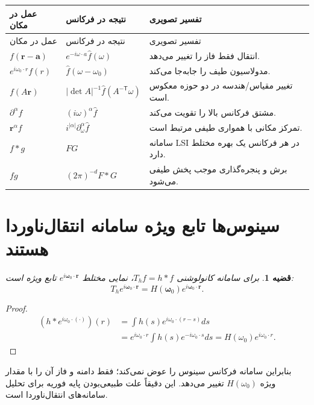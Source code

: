 \documentclass[12pt,openany,oneside]{book}
\newtheorem{theorem}{قضیه}[chapter]
\newcommand{\vect}[1]{\bm{#1}}
\begin{document}
\begin{longtable}{p{}p{}p{}}
\toprule
عمل در مکان & نتیجه در فرکانس & تفسیر تصویری\\
\midrule
\endfirsthead
\toprule
عمل در مکان & نتیجه در فرکانس & تفسیر تصویری\\
\midrule
\endhead
\(f(\vect r-\vect a)\) & \(e^{-i\omega\cdot a}\widehat f(\omega)\) & انتقال فقط فاز را تغییر می‌دهد.\\
\(e^{i\omega_0\cdot r}f(r)\) & \(\widehat f(\omega-\omega_0)\) & مدولاسیون طیف را جابه‌جا می‌کند.\\
\(f(A\vect r)\) & \(|\det A|^{-1}\widehat f(A^{-\mathsf T}\omega)\) & تغییر مقیاس/هندسه در دو حوزه معکوس است.\\
\(\partial^\alpha f\) & \((i\omega)^\alpha\widehat f\) & مشتق فرکانس بالا را تقویت می‌کند.\\
\(\vect r^\alpha f\) & \(i^{|\alpha|}\partial_\omega^\alpha\widehat f\) & تمرکز مکانی با همواری طیفی مرتبط است.\\
\(f*g\) & \(FG\) & سامانه LSI در هر فرکانس یک بهره مختلط دارد.\\
\(fg\) & \((2\pi)^{-d}F*G\) & برش و پنجره‌گذاری موجب پخش طیفی می‌شود.\\
\bottomrule
\end{longtable}

\section{سینوس‌ها تابع ویژه سامانه انتقال‌ناوردا هستند}

\begin{theorem}
برای سامانه کانولوشنی \(T_h f=h*f\)، نمایی مختلط \(e^{i\vect\omega_0\cdot\vect r}\) تابع ویژه است:
\begin{equation}
T_h e^{i\vect\omega_0\cdot\vect r}
=H(\vect\omega_0)e^{i\vect\omega_0\cdot\vect r}.
\label{eq:sin-eigen}
\end{equation}
\end{theorem}

\begin{proof}
\begin{align}
(h*e^{i\omega_0\cdot(\cdot)})(r)
&=\int h(s)e^{i\omega_0\cdot(r-s)}ds\\
&=e^{i\omega_0\cdot r}\int h(s)e^{-i\omega_0\cdot s}ds
=H(\omega_0)e^{i\omega_0\cdot r}.
\end{align}
\end{proof}

بنابراین سامانه فرکانس سینوس را عوض نمی‌کند؛ فقط دامنه و فاز آن را با مقدار ویژه \(H(\omega_0)\)
تغییر می‌دهد. این دقیقاً علت طبیعی‌بودن پایه فوریه برای تحلیل سامانه‌های انتقال‌ناوردا است.
\end{document}
